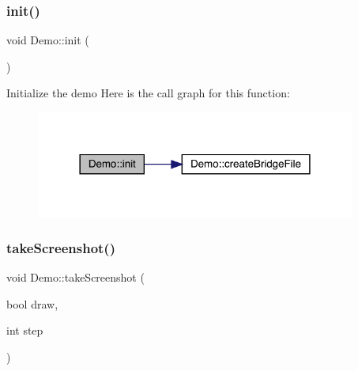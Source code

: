 \subsubsection{\texorpdfstring{init()}{init()}}
{\footnotesize\ttfamily void Demo\+::init (\begin{DoxyParamCaption}{ }\end{DoxyParamCaption})}

Initialize the demo Here is the call graph for this function\+:\nopagebreak
\begin{figure}[H]
\begin{center}
\leavevmode
\includegraphics[width=298pt]{class_demo_a585ce54e47b0624ca078492d9aa1c59c_cgraph}
\end{center}
\end{figure}
\mbox{\label{class_demo_a8f833d4d73ccdb28cd2e4387fc3bb9e1}} 
\subsubsection{\texorpdfstring{take\+Screenshot()}{takeScreenshot()}}
{\footnotesize\ttfamily void Demo\+::take\+Screenshot (\begin{DoxyParamCaption}\item[{bool}]{draw,  }\item[{int}]{step }\end{DoxyParamCaption})}

